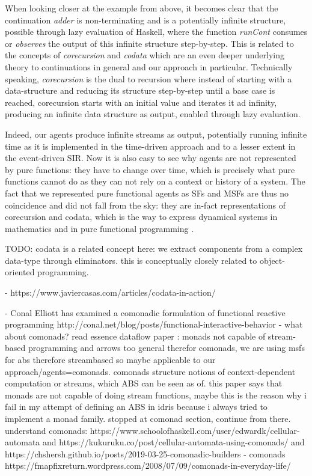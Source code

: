 \medskip

When looking closer at the example from above, it becomes clear that the continuation \textit{adder} is non-terminating and is a potentially infinite structure, possible through lazy evaluation of Haskell, where the function \textit{runCont} consumes or \textit{observes} the output of this infinite structure step-by-step. This is related to the concepts of \textit{corecursion} and \textit{codata} which are an even deeper underlying theory to continuations in general and our approach in particular. Technically speaking, \textit{corecursion} is the dual to recursion where instead of starting with a data-structure and reducing its structure step-by-step until a base case is reached, corecursion starts with an initial value and iterates it ad infinity, producing an infinite data structure as output, enabled through lazy evaluation.

Indeed, our agents produce infinite streams as output, potentially running infinite time as it is implemented in the time-driven approach and to a lesser extent in the event-driven SIR. Now it is also easy to see why agents are not represented by pure functions: they have to change over time, which is precisely what pure functions cannot do as they can not rely on a context or history of a system. The fact that we represented pure functional agents as SFs and MSFs are thus no coincidence and did not fall from the sky: they are in-fact representations of corecursion and codata, which is the way to express dynamical systems in mathematics and in pure functional programming \cite{ionescu_vulnerability_2009}.

TODO: codata is a related concept here: we extract components from a complex data-type through eliminators. this is conceptually closely related to object-oriented programming. \cite{downen_codata_2019}

\medskip

- https://www.javiercasas.com/articles/codata-in-action/

- Conal Elliott has examined a comonadic formulation of functional reactive programming http://conal.net/blog/posts/functional-interactive-behavior
- what about comonads? read essence dataflow paper \cite{uustalu_essence_2006}: monads not capable of stream-based programming and arrows too general therefor comonads, we are using msfs for abs therefore streambased so maybe applicable to our approach/agents=comonads. comonads structure notions of context-dependent computation or streams, which ABS can be seen as of. this paper says that monads are not capable of doing stream functions, maybe this is the reason why i fail in my attempt of defining an ABS in idris because i always tried to implement a monad family. stopped at comonad section, continue from there. understand comonads: https://www.schoolofhaskell.com/user/edwardk/cellular-automata and https://kukuruku.co/post/cellular-automata-using-comonads/ and https://chshersh.github.io/posts/2019-03-25-comonadic-builders
- comonads https://fmapfixreturn.wordpress.com/2008/07/09/comonads-in-everyday-life/


